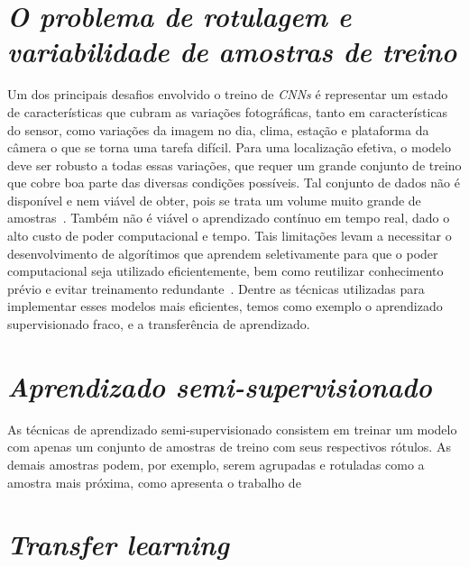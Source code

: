 \section{\textit{O problema de rotulagem e variabilidade de amostras de treino}}\label{sec:Cap2_MR}


Um dos principais desafios envolvido o treino de \textit{CNNs} é representar um estado de características que cubram as variações fotográficas, tanto em características do sensor, como variações da imagem no dia, clima, estação e plataforma da câmera o que se torna uma tarefa difícil. Para uma localização efetiva, o modelo deve ser robusto a todas essas variações, que requer um grande conjunto de treino que cobre boa parte das diversas condições possíveis. Tal conjunto de dados não é disponível e nem viável de obter, pois se trata um volume muito grande de amostras~\cite{rs13194017}. Também não é viável o aprendizado contínuo em tempo real, dado o alto custo de poder computacional e tempo. Tais limitações levam a necessitar o desenvolvimento de algorítimos que aprendem seletivamente para que o poder computacional seja utilizado eficientemente, bem como reutilizar conhecimento prévio e evitar treinamento redundante~\cite{rostami2019learning}.  Dentre as técnicas utilizadas para implementar esses modelos mais eficientes, temos como exemplo o aprendizado supervisionado fraco, e a transferência de aprendizado. 

\section{\textit{Aprendizado semi-supervisionado}}\label{sec:Cap2_MR}

As técnicas de aprendizado semi-supervisionado consistem em treinar um modelo com apenas um conjunto de amostras de treino com seus respectivos rótulos. As demais amostras podem, por exemplo, serem agrupadas e rotuladas como a amostra mais próxima, como apresenta o trabalho de~\cite{Sanches2003}

\section{\textit{Transfer learning}}\label{sec:Cap2_MR}


